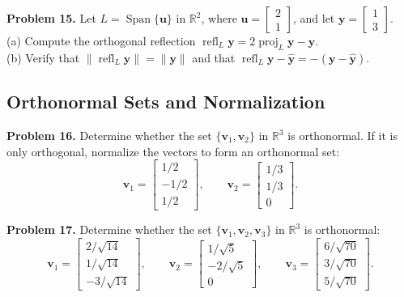 \documentclass[11pt, letterpaper]{article}
\theoremstyle{definition}
\theoremstyle{remark}
\begin{document}
\textbf{Problem 15.} Let $L = \operatorname{Span}\{\mathbf{u}\}$ in $\mathbb{R}^2$, where $\mathbf{u} = \begin{bmatrix} 2 \\ 1 \end{bmatrix}$, and let $\mathbf{y} = \begin{bmatrix} 1 \\ 3 \end{bmatrix}$. \\
(a) Compute the orthogonal reflection $\operatorname{refl}_L \mathbf{y} = 2\operatorname{proj}_L \mathbf{y} - \mathbf{y}$. \\
(b) Verify that $\|\operatorname{refl}_L \mathbf{y}\| = \|\mathbf{y}\|$ and that $\operatorname{refl}_L \mathbf{y} - \hat{\mathbf{y}} = -(\mathbf{y} - \hat{\mathbf{y}})$.

\subsection{Orthonormal Sets and Normalization}

\textbf{Problem 16.} Determine whether the set $\{\mathbf{v}_1, \mathbf{v}_2\}$ in $\mathbb{R}^3$ is orthonormal. If it is only orthogonal, normalize the vectors to form an orthonormal set:
\[
\mathbf{v}_1 = \begin{bmatrix} 1/2 \\ -1/2 \\ 1/2 \end{bmatrix}, \qquad
\mathbf{v}_2 = \begin{bmatrix} 1/3 \\ 1/3 \\ 0 \end{bmatrix}.
\]

\textbf{Problem 17.} Determine whether the set $\{\mathbf{v}_1, \mathbf{v}_2, \mathbf{v}_3\}$ in $\mathbb{R}^3$ is orthonormal:
\[
\mathbf{v}_1 = \begin{bmatrix} 2/\sqrt{14} \\ 1/\sqrt{14} \\ -3/\sqrt{14} \end{bmatrix}, \qquad
\mathbf{v}_2 = \begin{bmatrix} 1/\sqrt{5} \\ -2/\sqrt{5} \\ 0 \end{bmatrix}, \qquad
\mathbf{v}_3 = \begin{bmatrix} 6/\sqrt{70} \\ 3/\sqrt{70} \\ 5/\sqrt{70} \end{bmatrix}.
\]
\end{document}
